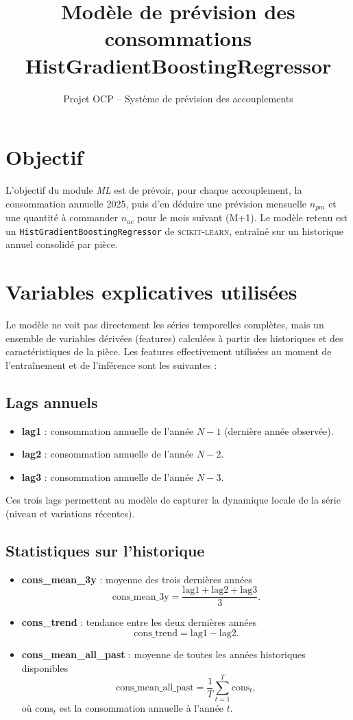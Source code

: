 \documentclass[11pt,a4paper]{article}
\title{Modèle de prévision des consommations\\HistGradientBoostingRegressor}
\author{Projet OCP -- Système de prévision des accouplements}
\date{}
\begin{document}
\maketitle

\section{Objectif}

L'objectif du module \emph{ML} est de prévoir, pour chaque accouplement, la consommation annuelle 2025, puis d'en déduire une prévision mensuelle $n_{pm}$ et une quantité à commander $n_{ac}$ pour le mois suivant (M+1). Le modèle retenu est un \texttt{HistGradientBoostingRegressor} de \textsc{scikit-learn}, entraîné sur un historique annuel consolidé par pièce.

\section{Variables explicatives utilisées}

Le modèle ne voit pas directement les séries temporelles complètes, mais un ensemble de variables dérivées (features) calculées à partir des historiques et des caractéristiques de la pièce. Les features effectivement utilisées au moment de l'entraînement et de l'inférence sont les suivantes :

\subsection{Lags annuels}

\begin{itemize}
  \item \textbf{lag1} : consommation annuelle de l'année $N-1$ (dernière année observée).
  \item \textbf{lag2} : consommation annuelle de l'année $N-2$.
  \item \textbf{lag3} : consommation annuelle de l'année $N-3$.
\end{itemize}

Ces trois lags permettent au modèle de capturer la dynamique locale de la série (niveau et variations récentes).

\subsection{Statistiques sur l'historique}

\begin{itemize}
  \item \textbf{cons\_mean\_3y} : moyenne des trois dernières années
  \[
    \text{cons\_mean\_3y} = \frac{\text{lag1} + \text{lag2} + \text{lag3}}{3}.
  \]
  \item \textbf{cons\_trend} : tendance entre les deux dernières années
  \[
    \text{cons\_trend} = \text{lag1} - \text{lag2}.
  \]
  \item \textbf{cons\_mean\_all\_past} : moyenne de toutes les années historiques disponibles
  \[
    \text{cons\_mean\_all\_past} = \frac{1}{T}\sum_{t=1}^{T} \text{cons}_t,
  \]
  où $\text{cons}_t$ est la consommation annuelle à l'année $t$.
\end{itemize}
\end{document}
